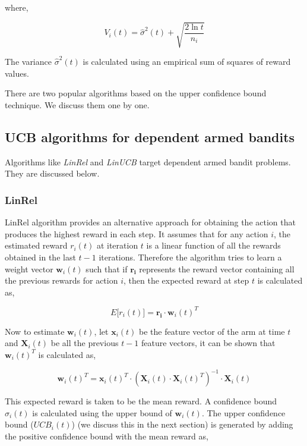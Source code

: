 \documentclass[english]{tktltiki}
\begin{document}
where,

\begin{equation}
	V_i(t) = \hat{\sigma}^2(t) + \sqrt{\frac{2 \ln t}{n_i}}
\end{equation}

The variance $\hat{\sigma}^2(t)$ is calculated using an empirical sum of squares of reward values.

There are two popular algorithms based on the upper confidence bound technique. We discuss them one by one.

\subsection{UCB algorithms for dependent armed bandits}

Algorithms like \textit{LinRel} and \textit{LinUCB} target dependent armed bandit problems. They are discussed below.


\subsubsection{LinRel}

LinRel algorithm \cite{linrel} provides an alternative approach for obtaining the action that produces the highest reward in each step. It assumes that for any action $i$, the estimated reward $r_i(t)$ at iteration $t$ is a linear function of all the rewards obtained in the last $t-1$ iterations. Therefore the algorithm tries to learn a weight vector $\mathbf{w}_i(t)$ such that if $\mathbf{r_i}$ represents the reward vector containing all the previous rewards for action $i$, then the expected reward at step $t$ is calculated as,

\begin{equation}
E\big[r_i(t)\big] = \mathbf{r_i} \cdot \mathbf{w}_i(t)^T
\end{equation}

Now to estimate $\mathbf{w}_i(t)$, let $\mathbf{x}_i(t)$ be the feature vector of the arm at time $t$ and $\mathbf{X}_i(t)$ be all the previous $t-1$ feature vectors, it can be shown that $\mathbf{w}_i(t)^T$ is calculated as,

\begin{equation}
\mathbf{w}_i(t)^T = \mathbf{x}_i(t)^T \cdot (\mathbf{X}_i(t) \cdot \mathbf{X}_i(t)^T)^{-1} \cdot \mathbf{X}_i(t)
\end{equation}


This expected reward is taken to be the mean reward. A confidence bound $\sigma_i(t)$ is calculated using the upper bound of $\mathbf{w}_i(t)$. The upper confidence bound ($UCB_i(t)$) \cite{ucb} (we discuss this in the next section) is generated by adding the positive confidence bound with the mean reward as,
\end{document}
